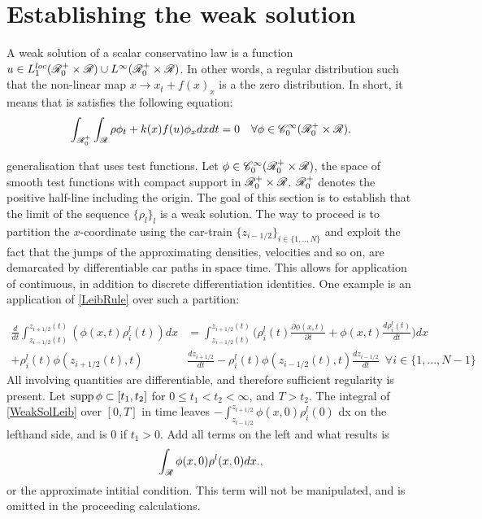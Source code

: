 \section{Establishing the weak solution} \label{section:weak_sol}

A weak solution of a scalar conservatino law is a function $u \in L_1^{loc}(\mathscr{R}^+_0 \times \mathscr{R}) \cup L^\infty(\mathscr{R}^+_0 \times \mathscr{R})$. In other words, a regular distribution such that the non-linear map $x \rightarrow x_t + f(x)_x$ is a the zero distribution. In short, it means that is satisfies the following equation:
\begin{equation} \label{space_dep_weak_s}
    \int_{\mathscr{R}_0^+}\int_{\mathscr{R}} \rho \phi_t + k(x) f(u) \phi_x dx dt = 0 \quad \forall \phi \in \mathscr{C}^\infty_0(\mathscr{R}^+_0 \times \mathscr{R}).
\end{equation}

generalisation that uses test functions. Let $\phi \in \mathscr{C}^\infty_0(\mathscr{R}^+_0 \times \mathscr{R})$, the space of smooth test functions with compact support in  $\mathscr{R}^+_0\times\mathscr{R}$. $\mathscr{R}_0^+$ denotes the positive half-line including the origin. The goal of this section is to establish that the limit of the sequence $\{\rho_l\}_l$ is a weak solution. The way to proceed is to partition the $x$-coordinate using the car-train $\{z_{i-1/2}\}_{i \in \{1,..,N\}}$ and exploit the fact that the jumps of the approximating densities, velocities and so on,  are demarcated by differentiable car paths in space time. This allows for application of continuous, in addition to discrete differentiation identities. One example is an application of \eqref{LeibRule} over such a partition: 

\begin{align}
    \frac{d}{dt} \int_{z_{i-1/2}(t)}^{z_{i+1/2}(t)} (\phi(x,t) \rho^l_i(t))  dx &= \int_{z_{i-1/2}(t)}^{z_{i+1/2}(t)} \Big(\rho^l_i(t) \frac{\partial \phi(x,t) }{\partial t} + \phi(x,t) \frac{d \rho^l_i(t) }{dt} \Big) dx \nonumber \\
    + \rho^l_i(t) \phi(z_{i+1/2}(t),t) &\frac{dz_{i+1/2}}{dt} - \rho^l_i(t) \phi(z_{i-1/2}(t), t) \frac{dz_{i-1/2}}{dt} \label{WeakSolLeib} \, \, \, \forall i \in \{1,...,N-1\}
\end{align}
All involving quantities are differentiable, and therefore sufficient regularity is present. Let $\operatorname{supp} \phi \subset [t_1, t_2]$ for $0 \leq t_1 < t_2 < \infty$, and $T > t_2$.  The integral of  \eqref{WeakSolLeib} over $[0,T]$ in time leaves $-\int_{z_{i-1/2}}^{z_{i+1/2}} \phi(x,0) \rho^l_i(0)$ dx on the lefthand side, and is $0$ if $t_1>0$. Add all terms on the left and what results is 
\begin{equation}
    \int_{\mathscr{R}} \phi(x,0) \rho^l(x,0) dx. \label{DiscreteInitCond},
\end{equation}
or the approximate intitial condition. This term will not be manipulated, and is omitted in the proceeding calculations. 

